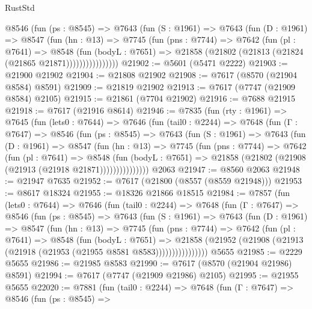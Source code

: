 \begin{lexlean}{RustStd}
\begin{coremodule}
            @8546
              (fun (ps : @8545) =>
              @7643
                (fun (S : @1961) =>
                @7643
                  (fun (D : @1961) =>
                  @8547
                    (fun (hn : @13) =>
                    @7745
                      (fun (pns : @7744) =>
                      @7642
                        (fun (pl : @7641) =>
                        @8548
                          (fun (bodyL : @7651) =>
                          @21858 (@21802 (@21813 (@21824 (@21865 @21871))))))))))))))))
@21902 := @5601 (@5471 @2222)
@21903 := @21900 @21902
@21904 := @21808 @21902
@21908 := @7617 (@8570 (@21904 @8584) @8591)
@21909 := @21819 @21902
@21913 := @7617 (@7747 (@21909 @8584) @2105)
@21915 := @21861 (@7704 @21902)
@21916 := @7688 @21915
@21918 := @7617 (@21916 @8614)
@21946 := @7835
    (fun (rty : @1961) =>
    @7645
      (fun (lets0 : @7644) =>
      @7646
        (fun (tail0 : @2244) =>
        @7648
          (fun (Γ : @7647) =>
          @8546
            (fun (ps : @8545) =>
            @7643
              (fun (S : @1961) =>
              @7643
                (fun (D : @1961) =>
                @8547
                  (fun (hn : @13) =>
                  @7745
                    (fun (pns : @7744) =>
                    @7642
                      (fun (pl : @7641) =>
                      @8548
                        (fun (bodyL : @7651) =>
                        @21858 (@21802 (@21908 (@21913 (@21918 @21871)))))))))))))))
    @2063
@21947 := @8560 @2063
@21948 := @21947 @7635
@21952 := @7617 (@21800 (@8557 (@8559 @21948)))
@21953 := @8617 @18324
@21955 := @18326 @21866 @18515
@21984 := @7857
    (fun (lets0 : @7644) =>
    @7646
      (fun (tail0 : @2244) =>
      @7648
        (fun (Γ : @7647) =>
        @8546
          (fun (ps : @8545) =>
          @7643
            (fun (S : @1961) =>
            @7643
              (fun (D : @1961) =>
              @8547
                (fun (hn : @13) =>
                @7745
                  (fun (pns : @7744) =>
                  @7642
                    (fun (pl : @7641) =>
                    @8548
                      (fun (bodyL : @7651) =>
                      @21858
                        (@21952 (@21908 (@21913 (@21918 (@21953 (@21955 @8581 @8583))))))))))))))))
    @5655
@21985 := @2229 @5655
@21986 := @21985 @8583
@21990 := @7617 (@8570 (@21904 @21986) @8591)
@21994 := @7617 (@7747 (@21909 @21986) @2105)
@21995 := @21955 @5655
@22020 := @7881
    (fun (tail0 : @2244) =>
    @7648
      (fun (Γ : @7647) =>
      @8546
        (fun (ps : @8545) =>

\end{coremodule}
\end{lexlean}
